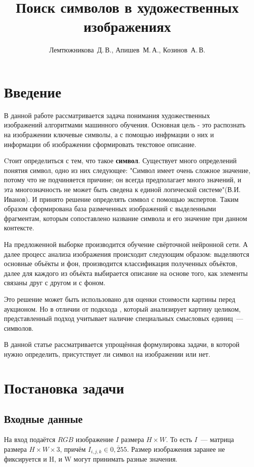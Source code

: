\documentclass[12pt,twoside]{article}
\title
    [Поиск символов в художественных изображениях] %
    {Поиск символов в художественных изображениях}
\author
    {Лемтюжникова~Д.\,В., Апишев~М.\,А., Козинов~А.\,В.} %
\begin{document}
\maketitle
\section{Введение}

В данной работе рассматривается задача понимания художественных изображений алгоритмами машинного обучения.  Основная цель - это распознать на изображении ключевые символы, а с помощью инфрмации о них и информации об изображении сформировать текстовое описание.

Cтоит определиться с тем, что такое \textbf{символ}. Существует много определений понятия символ, одно из них следующее: "Символ имеет очень сложное значение, потому что не подчиняется причине; он всегда предполагает много значений, и эта многозначность не может быть сведена к единой логической системе"(В.И. Иванов).  И принято решение определять символ с помощью экспертов. Таким образом сформирована база размеченных изображений с выделенными фрагментам, которым сопоставлено название символа и его значение при данном контексте.


На предложенной выборке производится обучение свёрточной нейронной сети. А далее процесс анализа изображения происходит следующим образом: выделяются основные объёкты и фон, производится классификация полученных объёктов, далее для каждого из объёкта выбирается описание на основе того, как элементы связаны друг с другом и с фоном.

Это решение может быть использовано для оценки стоимости картины перед аукционом. Но в отличии от подкхода \cite{art_appraisal}, который анализирует картину целиком, представленный подход учитывает наличие специальных смысловых единиц~--- символов.


В данной статье рассматривается упрощённая формулировка задачи, в которой нужно определить, присутствует ли символ на изображении или нет.

\section{Постановка задачи}
\subsection{Входные данные}
На вход подаётся $RGB$ изображение $I$ размера $H\times W$. То есть $I$~--- матрица размера $H \times W \times 3$, причём $I_{i, j, k} \in \overline{0, 255}$. Размер изображения заранее не фиксируется и H, и W могут принимать разные значения.
\end{document}
